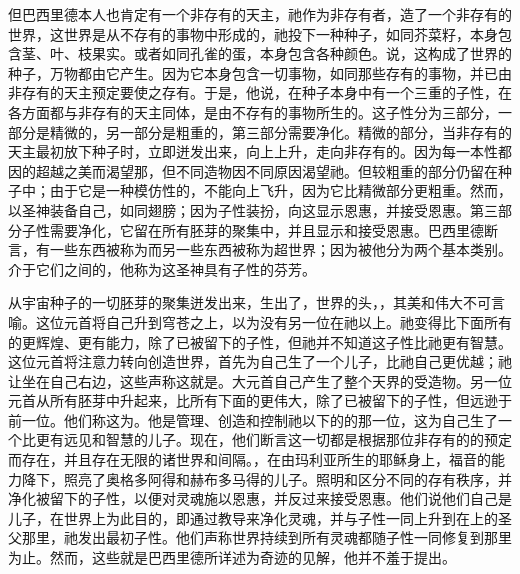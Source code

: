 但巴西里德本人也肯定有一个非存有的天主，祂作为非存有者，造了一个非存有的世界，这世界是从不存有的事物中形成的，祂投下一种种子，如同芥菜籽，本身包含茎、叶、枝果实。或者如同孔雀的蛋，本身包含各种颜色。说，这构成了世界的种子，万物都由它产生。因为它本身包含一切事物，如同那些存有的事物，并已由非存有的天主预定要使之存有。于是，他说，在种子本身中有一个三重的子性，在各方面都与非存有的天主同体，是由不存有的事物所生的。这子性分为三部分，一部分是精微的，另一部分是粗重的，第三部分需要净化。精微的部分，当非存有的天主最初放下种子时，立即迸发出来，向上上升，走向非存有的。因为每一本性都因的超越之美而渴望那，但不同造物因不同原因渴望祂。但较粗重的部分仍留在种子中；由于它是一种模仿性的，不能向上飞升，因为它比精微部分更粗重。然而，以圣神装备自己，如同翅膀；因为子性装扮，向这显示恩惠，并接受恩惠。第三部分子性需要净化，它留在所有胚芽的聚集中，并且显示和接受恩惠。巴西里德断言，有一些东西被称为而另一些东西被称为超世界；因为被他分为两个基本类别。介于它们之间的，他称为这圣神具有子性的芬芳。\par

从宇宙种子的一切胚芽的聚集迸发出来，生出了，世界的头，，其美和伟大不可言喻。这位元首将自己升到穹苍之上，以为没有另一位在祂以上。祂变得比下面所有的更辉煌、更有能力，除了已被留下的子性，但祂并不知道这子性比祂更有智慧。这位元首将注意力转向创造世界，首先为自己生了一个儿子，比祂自己更优越；祂让坐在自己右边，这些声称这就是。大元首自己产生了整个天界的受造物。另一位元首从所有胚芽中升起来，比所有下面的更伟大，除了已被留下的子性，但远逊于前一位。他们称这为。他是管理、创造和控制祂以下的的那一位，这为自己生了一个比更有远见和智慧的儿子。现在，他们断言这一切都是根据那位非存有的的预定而存在，并且存在无限的诸世界和间隔。，在由玛利亚所生的耶稣身上，福音的能力降下，照亮了奥格多阿得和赫布多马得的儿子。照明和区分不同的存有秩序，并净化被留下的子性，以便对灵魂施以恩惠，并反过来接受恩惠。他们说他们自己是儿子，在世界上为此目的，即通过教导来净化灵魂，并与子性一同上升到在上的圣父那里，祂发出最初子性。他们声称世界持续到所有灵魂都随子性一同修复到那里为止。然而，这些就是巴西里德所详述为奇迹的见解，他并不羞于提出。\par

